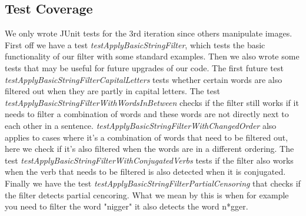 \subsection{Test Coverage}
We only wrote JUnit tests for the 3rd iteration since others manipulate images.
First off we have a test \textit{testApplyBasicStringFilter}, which tests the basic functionality of our filter with some standard examples. 
Then we also wrote some tests that may be useful for future upgrades of our code.
The first future test \textit{testApplyBasicStringFilterCapitalLetters} tests whether certain words 
are also filtered out when they are partly in capital letters. 
The test \textit{testApplyBasicStringFilterWithWordsInBetween} checks if the filter still works if 
it needs to filter a combination of words and these words are not directly next to each other in a sentence.
\textit{testApplyBasicStringFilterWithChangedOrder} also applies to cases where it's a combination of
words that need to be filtered out, here we check if it's also filtered when the words are in a different 
ordering.
The test \textit{testApplyBasicStringFilterWithConjugatedVerbs} tests if the filter also works when the 
verb that needs to be filtered is also detected when it is conjugated.
Finally we have the test \textit{testApplyBasicStringFilterPartialCensoring} that checks if the filter detects 
partial cencoring. What we mean by this is when for example you need to filter the word "nigger" it also
detects the word n*gger.
